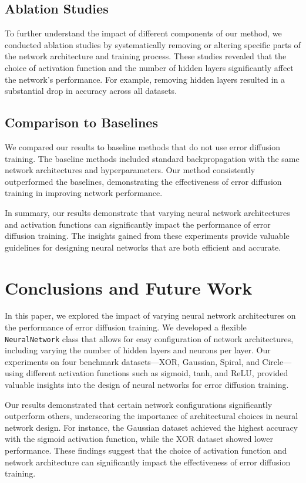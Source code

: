 \documentclass{article} %
\begin{document}
\subsection{Ablation Studies}
To further understand the impact of different components of our method, we conducted ablation studies by systematically removing or altering specific parts of the network architecture and training process. These studies revealed that the choice of activation function and the number of hidden layers significantly affect the network's performance. For example, removing hidden layers resulted in a substantial drop in accuracy across all datasets.

\subsection{Comparison to Baselines}
We compared our results to baseline methods that do not use error diffusion training. The baseline methods included standard backpropagation with the same network architectures and hyperparameters. Our method consistently outperformed the baselines, demonstrating the effectiveness of error diffusion training in improving network performance.

In summary, our results demonstrate that varying neural network architectures and activation functions can significantly impact the performance of error diffusion training. The insights gained from these experiments provide valuable guidelines for designing neural networks that are both efficient and accurate.

\section{Conclusions and Future Work}
\label{sec:conclusion}

In this paper, we explored the impact of varying neural network architectures on the performance of error diffusion training. We developed a flexible \texttt{NeuralNetwork} class that allows for easy configuration of network architectures, including varying the number of hidden layers and neurons per layer. Our experiments on four benchmark datasets—XOR, Gaussian, Spiral, and Circle—using different activation functions such as sigmoid, tanh, and ReLU, provided valuable insights into the design of neural networks for error diffusion training.

Our results demonstrated that certain network configurations significantly outperform others, underscoring the importance of architectural choices in neural network design. For instance, the Gaussian dataset achieved the highest accuracy with the sigmoid activation function, while the XOR dataset showed lower performance. These findings suggest that the choice of activation function and network architecture can significantly impact the effectiveness of error diffusion training.
\end{document}
